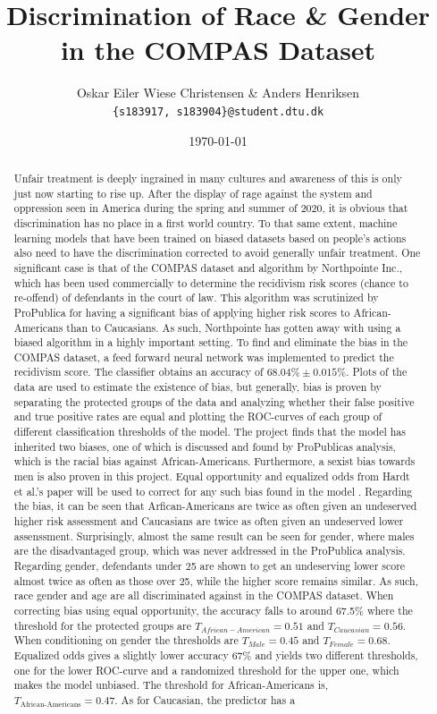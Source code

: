\documentclass[11pt, fleqn, titlepage]{article}
\title{Discrimination of Race \& Gender in the COMPAS Dataset}
\author{Oskar Eiler Wiese Christensen \& Anders Henriksen \\ \texttt{\{s183917, s183904\}@student.dtu.dk}}
\date{\today}
\begin{document}
	
	\maketitle
	\begin{abstract}
	\small
	\noindent
	Unfair treatment is deeply ingrained in many cultures and awareness of this is only just now starting to rise up. After the display of rage against the system and oppression seen in America during the spring and summer of 2020, it is obvious that discrimination has no place in a first world country. To that same extent, machine learning models that have been trained on biased datasets based on people's actions also need to have the discrimination corrected to avoid generally unfair treatment. One significant case is that of the COMPAS dataset and algorithm by Northpointe Inc., which has been used commercially to determine the recidivism risk scores (chance to re-offend) of defendants in the court of law. This algorithm was scrutinized by ProPublica for having a significant bias of applying higher risk scores to African-Americans than to Caucasians. As such, Northpointe has gotten away with using a biased algorithm in a highly important setting. To find and eliminate the bias in the COMPAS dataset, a feed forward neural network was implemented to predict the recidivism score. The classifier obtains an accuracy of $ 68.04 \% \pm 0.015 \% $. Plots of the data are used to estimate the existence of bias, but generally, bias is proven by separating the protected groups of the data and analyzing whether their false positive and true positive rates are equal and plotting the ROC-curves of each group of different classification thresholds of the model. The project finds that the model has inherited two biases, one of which is discussed and found by ProPublicas analysis, which is the racial bias against African-Americans. Furthermore, a sexist bias towards men is also proven in this project. Equal opportunity and equalized odds from Hardt et al.'s paper will be used to correct for any such bias found in the model \cite{equal_of_oppor}. Regarding the bias, it can be seen that Arfican-Americans are twice as often given an undeserved higher risk assessment and Caucasians are twice as often given an undeserved lower assenssment. Surprisingly, almost the same result can be seen for gender, where males are the disadvantaged group, which was never addressed in the ProPublica analysis. Regarding gender, defendants under 25 are shown to get an undeserving lower score almost twice as often as those over 25, while the higher score remains similar. As such, race gender and age are all discriminated against in the COMPAS dataset. When correcting bias using equal opportunity, the accuracy falls to around 67.5\% where the threshold for the protected groups are $ T_{African-American}=0.51  $ and $ T_{Caucasian}=0.56 $. When conditioning on gender the thresholds are $ T_{Male} = 0.45 $ and $ T_{Female}=0.68 $. Equalized odds gives a slightly lower accuracy 67\% and yields two different thresholds, one for the lower ROC-curve and a randomized threshold for the upper one, which makes the model unbiased. The threshold for African-Americans is, $ T_{\text{African-Americans}} = 0.47 $. As for Caucasian, the predictor has a 
\end{abstract}
\end{document}

